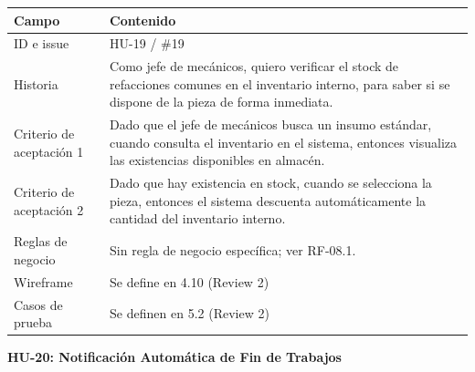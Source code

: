 {\def\LTcaptype{none} %
\begin{longtable}[]{@{}
  >{\raggedright\arraybackslash}p{}
  >{\raggedright\arraybackslash}p{}@{}}
\toprule\noalign{}
\begin{minipage}[b]{\linewidth}\raggedright
\textbf{Campo}
\end{minipage} & \begin{minipage}[b]{\linewidth}\raggedright
\textbf{Contenido}
\end{minipage} \\
\midrule\noalign{}
\endhead
\bottomrule\noalign{}
\endlastfoot
ID e issue & HU-19 / \#19 \\
Historia & Como jefe de mecánicos, quiero verificar el stock de
refacciones comunes en el inventario interno, para saber si se dispone
de la pieza de forma inmediata. \\
Criterio de aceptación 1 & Dado que el jefe de mecánicos busca un insumo
estándar, cuando consulta el inventario en el sistema, entonces
visualiza las existencias disponibles en almacén. \\
Criterio de aceptación 2 & Dado que hay existencia en stock, cuando se
selecciona la pieza, entonces el sistema descuenta automáticamente la
cantidad del inventario interno. \\
Reglas de negocio & Sin regla de negocio específica; ver RF-08.1. \\
Wireframe & Se define en 4.10 (Review 2) \\
Casos de prueba & Se definen en 5.2 (Review 2) \\
\end{longtable}
}

\textbf{HU-20: Notificación Automática de Fin de Trabajos}

